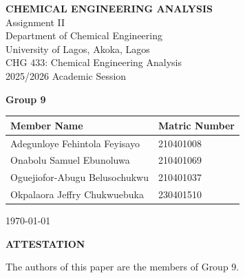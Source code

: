 \documentclass[12pt,a4paper]{article}
\begin{document}
\begin{titlepage}
  \centering
  \vspace*{1cm}

  {\LARGE \textbf{CHEMICAL ENGINEERING ANALYSIS}}\\[0.4cm]
  {\Large Assignment II}\\[1.5cm]

  {\large Department of Chemical Engineering\\
  University of Lagos, Akoka, Lagos\\[0.5cm]
  CHG 433: Chemical Engineering Analysis\\[0.5cm]
  2025/2026 Academic Session\\[1.5cm]}

  {\large \textbf{Group 9}}\\[2cm]

  \begin{tabular}{ll}
    \toprule
    \textbf{Member Name} & \textbf{Matric Number} \\
    \midrule
    Adegunloye Fehintola Feyisayo   & 210401008 \\
    Onabolu Samuel Ebunoluwa        & 210401069 \\
    Oguejiofor-Abugu Belusochukwu   & 210401037 \\
    Okpalaora Jeffry Chukwuebuka    & 230401510 \\
    \bottomrule
  \end{tabular}

  \vfill

  {\large \today}
\end{titlepage}

\newpage
\thispagestyle{plain}
\begin{center}
  {\large \textbf{ATTESTATION}}
\end{center}

The authors of this paper are the members of Group 9.\\[1cm]
\end{document}
